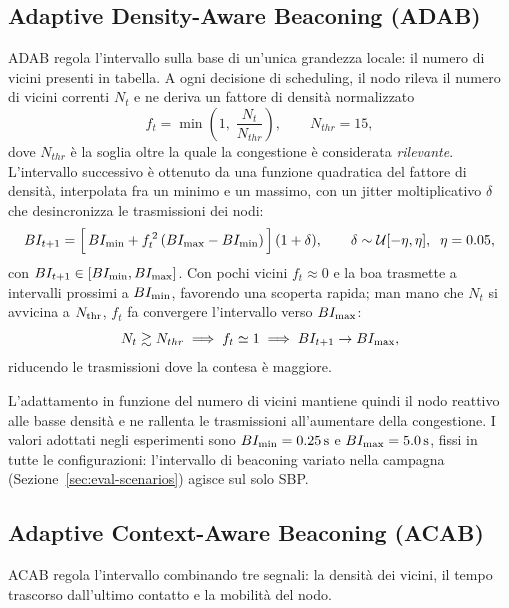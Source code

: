\subsection{Adaptive Density-Aware Beaconing (ADAB)}
\label{sec:adab}
ADAB regola l'intervallo sulla base di un'unica grandezza locale: il numero di
vicini presenti in tabella. A ogni decisione di scheduling, il nodo rileva il
numero di vicini correnti $N_t$ e ne deriva un fattore di densit\`a normalizzato
\begin{equation}
  f_t = \min\!\left(1,\; \frac{N_t}{N_{thr}}\right),
  \qquad N_{thr} = 15,
  \label{eq:adab-density}
\end{equation}
dove $N_{thr}$ \`e la soglia oltre la quale la congestione \`e considerata
\emph{rilevante}. L'intervallo successivo \`e ottenuto da una funzione quadratica del
fattore di densit\`a, interpolata fra un minimo e un massimo, con un jitter
moltiplicativo $\delta$ che desincronizza le trasmissioni dei nodi:
\begin{equation}
  BI_{t+1} = \Big[\,BI_{\min} + f_t^{\,2}\,(BI_{\max}-BI_{\min})\,\Big]\,(1+\delta),
  \qquad \delta \sim \mathcal{U}[-\eta,\eta],\;\; \eta=0.05,
  \label{eq:adab}
\end{equation}
con $BI_{t+1} \in [BI_{\min},BI_{\max}]$. Con pochi vicini
$f_t\approx 0$ e la boa trasmette a intervalli prossimi a $BI_{\min}$, favorendo
una scoperta rapida; man mano che $N_t$ si avvicina a $N_{\mathrm{thr}}$, $f_t$ fa convergere l'intervallo verso $BI_{\max}$:
\begin{equation}
    N_t \gtrsim N_{thr} \implies f_t \simeq 1 \implies BI_{t+1} \to BI_{\max},
\end{equation}
riducendo le trasmissioni dove la contesa \`e maggiore. 

L'adattamento in funzione del numero di vicini mantiene quindi il nodo reattivo
alle basse densit\`a e ne rallenta le trasmissioni all'aumentare della
congestione. I valori adottati negli esperimenti sono $BI_{\min} = \SI{0.25}{\second}$ e $BI_{\max} = \SI{5.0}{\second}$, fissi in tutte le configurazioni: l'intervallo di beaconing variato nella campagna (Sezione~\ref{sec:eval-scenarios}) agisce sul solo SBP.

\subsection{Adaptive Context-Aware Beaconing (ACAB)}
\label{sec:acab}
ACAB regola l'intervallo combinando tre segnali: la densit\`a dei vicini, il tempo
trascorso dall'ultimo contatto e la mobilit\`a del nodo.

